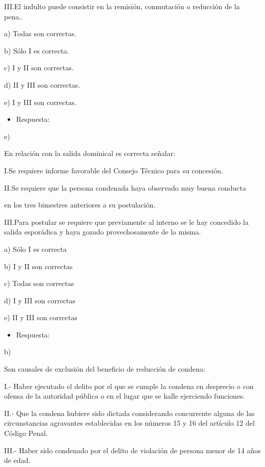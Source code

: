 \documentclass[letterpaper, 11pt]{article}
\begin{document}
III.El indulto puede consistir en la remisión, conmutación o reducción de la pena..

a) Todas son correctas.

b) Sólo I es correcta.

c) I y II son correctas.

d) II y III son correctas.

e) I y III son correctas.

\begin{itemize}
\item Respuesta:
\end{itemize}
e)


En relación con la salida dominical es correcta señalar:


I.Se requiere informe favorable del Consejo Técnico para su concesión.


II.Se requiere que la persona condenada haya observado muy buena
conducta

en los tres bimestres anteriores a su postulación.


III.Para postular se requiere que previamente al interno se le hay
concedido la salida esporádica y haya gozado provechosamente de la
misma.



a) Sólo I es correcta

b) I y II son correctas

c) Todas son correctas

d) I y III son correctas

e) II y III son correctas


\begin{itemize}
\item Respuesta:
\end{itemize}

b)


Son causales de exclusión del beneficio de reducción de condena:


I.- Haber ejecutado el delito por el que se cumple la condena en
desprecio o con ofensa de la autoridad pública o en el lugar que se
halle ejerciendo funciones.



II.- Que la condena hubiere sido dictada considerando concurrente
alguna de las circunstancias agravantes establecidas en los números 15
y 16 del artículo 12 del Código Penal.



III.- Haber sido condenado por el delito de violación de persona menor
de 14 años de edad.
\end{document}
